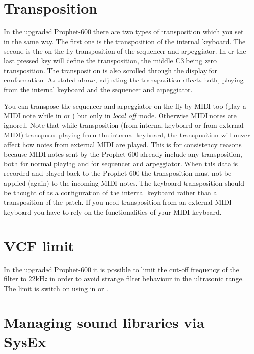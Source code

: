 \documentclass[landscape, 11pt, oneside, twoside]{report}
\newenvironment{flowtext}{\addmargin[0cm]{0cm}}{\endaddmargin} %
\begin{document}
\begin{flowtext}
\section{Transposition}\label{transposition}

In the upgraded Prophet-600 there are two types of transposition which you set in the same way. The first one is the transposition of the internal keyboard. The second is the on-the-fly transposition of the sequencer and arpeggiator. In \shiftmode or \shiftlock the last pressed key will define the transposition, the middle C3 being zero transposition. The transposition is also scrolled through the display for conformation. As stated above, adjusting the transposition affects both, playing from the internal keyboard and the sequencer and arpeggiator.

You can transpose the sequencer and arpeggiator on-the-fly by MIDI too (play a MIDI note while in \shiftmode or \shiftlock) but only in \textit{local off} mode. Otherwise MIDI notes are ignored. Note that while transposition (from internal keyboard or from external MIDI) transposes playing from the internal keyboard, the transposition will never affect how notes from external MIDI are played. This is for consistency reasons because MIDI notes sent by the Prophet-600 already include any transposition, both for normal playing and for sequencer and arpeggiator. When this data is recorded and played back to the Prophet-600 the transposition must not be applied (again) to the incoming MIDI notes. The keyboard transposition should be thought of as a configuration of the internal keyboard rather than a transposition of the patch. If you need transposition from an external MIDI keyboard you have to rely on the functionalities of your MIDI keyboard. 

\section{VCF limit}\label{limitsett}

In the upgraded Prophet-600 it is possible to limit the cut-off frequency of the filter to 22kHz in order to avoid strange filter behaviour in the ultrasonic range. The limit is switch on using  in \shiftmode or \shiftlock. 

\section{Managing sound libraries via SysEx}\label{patchmgmt}


\end{flowtext}
\end{document}

